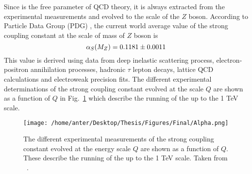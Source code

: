 Since \alps is the free parameter of QCD theory, it is always extracted from the experimental measurements and evolved to the scale of the $Z$ boson. According to Particle Data Group (PDG) \cite{Patrignani:2016xqp}, the current world average value of the strong coupling constant at the scale of mass of $Z$ boson is 
\begin{equation}
\alpha_S(M_Z) = 0.1181 \pm 0.0011
\end{equation}
This value is derived using data from deep inelastic scattering process, electron-positron annihilation processes, hadronic $\tau$ lepton decays, lattice QCD calculations and electroweak precision fits. The different experimental determinations of the strong coupling constant evolved at the scale $Q$ are shown as a function of $Q$ in Fig.~\ref{fig:alpha_pdg} which describe the running of the \alps up to the 1 TeV scale.
\vspace*{2mm}
\begin{figure}[!h]
\begin{center}
\hspace*{-7mm}
\texttt{[image: /home/anter/Desktop/Thesis/Figures/Final/Alpha.png]}\\
\vspace*{4mm}
\caption[Running of the strong coupling constant evolved at the energy scale $Q$ as a function of $Q$.]{The different experimental measurements of the strong coupling constant \alps evolved at the energy scale $Q$ are shown as a function of $Q$. These describe the running of the \alps up to the 1 TeV scale. Taken from ~\cite{Patrignani:2016xqp}.}
\label{fig:alpha_pdg}
\end{center}
\end{figure}


